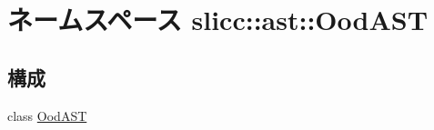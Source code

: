 \hypertarget{namespaceslicc_1_1ast_1_1OodAST}{
\section{ネームスペース slicc::ast::OodAST}
\label{namespaceslicc_1_1ast_1_1OodAST}
}
\subsection*{構成}
\begin{DoxyCompactItemize}
\item 
class \hyperlink{classslicc_1_1ast_1_1OodAST_1_1OodAST}{OodAST}
\end{DoxyCompactItemize}
